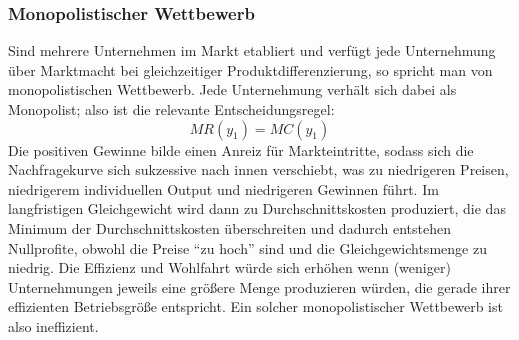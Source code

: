 \subsubsection*{Monopolistischer Wettbewerb}

Sind mehrere Unternehmen im Markt etabliert und verfügt jede Unternehmung über Marktmacht bei gleichzeitiger Produktdifferenzierung, so spricht man von monopolistischen Wettbewerb. Jede Unternehmung verhält sich dabei als Monopolist; also ist die relevante Entscheidungsregel: 
$$ MR( y_1 ) = MC( y_1 ) $$
Die positiven Gewinne bilde einen Anreiz für Markteintritte, sodass sich die Nachfragekurve sich sukzessive nach innen verschiebt, was zu niedrigeren Preisen, niedrigerem individuellen Output und niedrigeren Gewinnen führt. Im langfristigen Gleichgewicht wird dann zu Durchschnittskosten produziert, die das Minimum der Durchschnittskosten überschreiten und dadurch entstehen Nullprofite, obwohl die Preise \enquote{zu hoch} sind und die Gleichgewichtsmenge zu niedrig. Die Effizienz und Wohlfahrt würde sich erhöhen wenn (weniger) Unternehmungen jeweils eine größere Menge produzieren würden, die gerade ihrer effizienten Betriebsgröße entspricht. Ein solcher monopolistischer Wettbewerb ist also ineffizient.